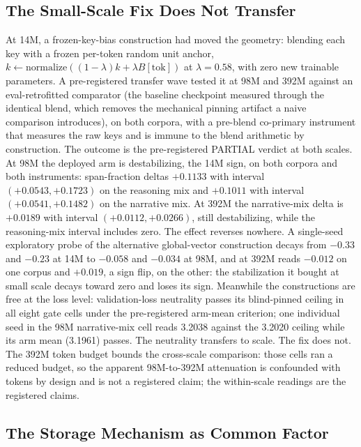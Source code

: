 \subsection{The Small-Scale Fix Does Not Transfer}

At 14M, a frozen-key-bias construction had moved the geometry: blending
each key with a frozen per-token random unit anchor,
$k \leftarrow \mathrm{normalize}((1-\lambda) k + \lambda B[\mathrm{tok}])$
at $\lambda = 0.58$, with zero new trainable
parameters. A
pre-registered transfer wave tested it at 98M and 392M against an
eval-retrofitted comparator (the baseline checkpoint measured through
the identical blend, which removes the mechanical pinning artifact a
naive comparison introduces), on both corpora, with a pre-blend
co-primary instrument that measures the raw keys and is immune to the
blend arithmetic by construction. The outcome is the pre-registered
PARTIAL verdict at both scales. At 98M the
deployed arm is destabilizing, the 14M sign, on both corpora and both
instruments: span-fraction deltas $+0.1133$ with interval
$(+0.0543, +0.1723)$ on the reasoning mix and $+0.1011$ with interval
$(+0.0541, +0.1482)$ on the narrative mix. At
392M the narrative-mix delta is $+0.0189$ with interval
$(+0.0112, +0.0266)$, still destabilizing, while the reasoning-mix
interval includes zero. The effect reverses
nowhere. A single-seed exploratory probe of the alternative
global-vector construction decays from $-0.33$ and $-0.23$ at 14M to
$-0.058$ and $-0.034$ at 98M, and at 392M reads $-0.012$ on one corpus
and $+0.019$, a sign flip, on the other: the
stabilization it bought at small scale decays toward zero and loses
its sign. Meanwhile the constructions are free at the loss level:
validation-loss neutrality passes its blind-pinned ceiling in all
eight gate cells under the pre-registered arm-mean criterion; one
individual seed in the 98M narrative-mix cell reads 3.2038 against the
3.2020 ceiling while its arm mean (3.1961) passes. The neutrality transfers to
scale. The fix does not. The 392M token budget bounds the
cross-scale comparison: those cells ran a reduced budget, so
the apparent 98M-to-392M attenuation is confounded with tokens by
design and is not a registered claim; the within-scale readings are the
registered claims.

\subsection{The Storage Mechanism as Common Factor}

